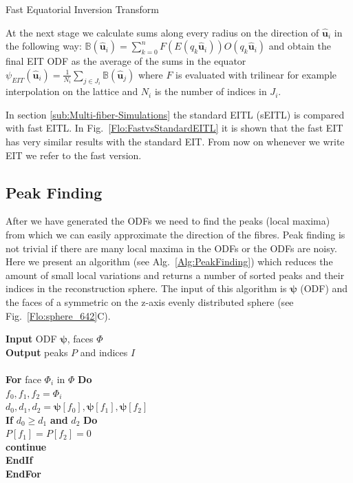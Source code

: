 \documentclass{bioinfo}
\begin{document}
\begin{methods}
\begin{algorithm}
\caption{Fast Equatorial Inversion Transform}


\label{Alg:Fast_EIT}
\end{algorithm}

At the next stage we calculate sums along every radius on the direction
of $\hat{\bm{u}}_{i}$ in the following way: $\mathbb{B}(\hat{\bm{u}}_{i})=\sum_{k=0}^{n}F(E(q_{k}\hat{\bm{u}}_{i}))O(q_{k}\hat{\bm{u}}_{i})$
and obtain the final EIT ODF as the average of the sums in the equator
$\psi_{EIT}(\hat{\bm{u}}_{i})=\frac{1}{N_i}\sum_{j\in J_i}\mathbb{B}(\hat{\bm{u}}_{j})$
where $F$ is evaluated with trilinear for example interpolation on
the lattice and $N_{i}$ is the number of indices in $J_{i}.$

In section \ref{sub:Multi-fiber-Simulations} the standard EITL (sEITL)
is compared with fast EITL. In Fig.~\ref{Flo:FastvsStandardEITL}
it is shown that the fast EIT has very similar results with the standard
EIT. From now on whenever we write EIT we refer to the fast version. 


\subsection{Peak Finding\label{sub:Peak-Finding}}

After we have generated the ODFs we need to find the peaks (local
maxima) from which we can easily approximate the direction of the
fibres. Peak finding is not trivial if there are many local maxima
in the ODFs or the ODFs are noisy. Here we present an algorithm (see
Alg.~\ref{Alg:PeakFinding}) which reduces the amount of small local
variations and returns a number of sorted peaks and their indices
in the reconstruction sphere. The input of this algorithm is $\bm{\psi}$
(ODF) and the faces of a symmetric on the z-axis evenly distributed
sphere (see Fig.~\ref{Flo:sphere_642}C).

%
\begin{algorithm}
\textbf{Input} ODF $\bm\psi$, faces $\Phi$ \\
\textbf{Output} peaks $P$ and indices $I$ \\
\\
\textbf{For} face $\Phi_i$ in $\Phi$ \textbf{Do}\\
\hspace*{2em} $f_0,f_1,f_2 = \Phi_i$ \\	
\hspace*{2em} $d_0,d_1,d_2 =\bm{\psi}[f_0],\bm{\psi}[f_1],\bm{\psi}[f_2]$ \\	
\hspace*{2em} \textbf{If} $d_0 \geq d_1$ \textbf{and} $d_2$ \textbf{Do}\\
\hspace*{4em} $P[f_1]=P[f_2]=0$ \\
\hspace*{4em} \textbf{continue} \\
\hspace*{2em} \textbf{EndIf} \\
\textbf{EndFor}


\end{algorithm}
\end{methods}
\end{document}
